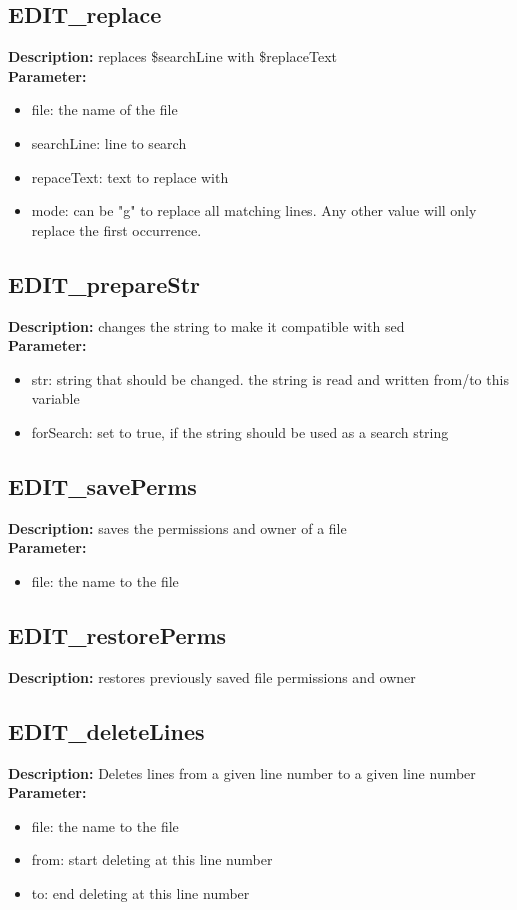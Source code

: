 \subsection{EDIT\_replace}
\textbf{Description:} replaces \$searchLine with \$replaceText\\
\textbf{Parameter:}
\begin{itemize}
\item file: the name of the file
\item searchLine: line to search
\item repaceText: text to replace with
\item mode: can be "g" to replace all matching lines. Any other value will only replace the first occurrence.
\end{itemize}

\subsection{EDIT\_prepareStr}
\textbf{Description:} changes the string to make it compatible with sed\\
\textbf{Parameter:}
\begin{itemize}
\item str: string that should be changed. the string is read and written from/to this variable
\item forSearch: set to true, if the string should be used as a search string
\end{itemize}

\subsection{EDIT\_savePerms}
\textbf{Description:} saves the permissions and owner of a file\\
\textbf{Parameter:}
\begin{itemize}
\item file: the name to the file
\end{itemize}

\subsection{EDIT\_restorePerms}
\textbf{Description:} restores previously saved file permissions and owner\\

\subsection{EDIT\_deleteLines}
\textbf{Description:} Deletes lines from a given line number to a given line number\\
\textbf{Parameter:}
\begin{itemize}
\item file: the name to the file
\item from: start deleting at this line number
\item to: end deleting at this line number
\end{itemize}

